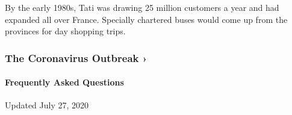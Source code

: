 By the early 1980s, Tati was drawing 25 million customers a year and had
expanded all over France. Specially chartered buses would come up from
the provinces for day shopping trips.

\href{https://www.nytimes.com/news-event/coronavirus?action=click\&pgtype=Article\&state=default\&region=MAIN_CONTENT_3\&context=storylines_faq}{}

\hypertarget{the-coronavirus-outbreak-}{%
\subsubsection{The Coronavirus Outbreak
›}\label{the-coronavirus-outbreak-}}

\hypertarget{frequently-asked-questions}{%
\paragraph{Frequently Asked
Questions}\label{frequently-asked-questions}}

Updated July 27, 2020

